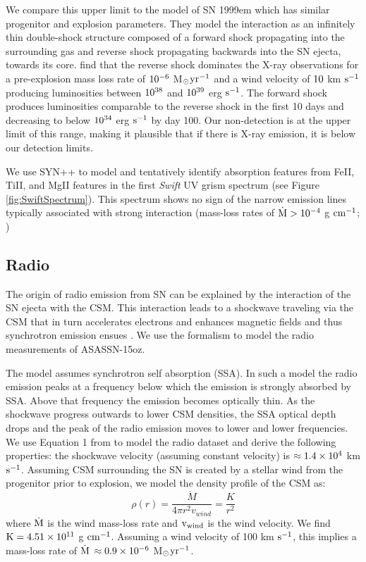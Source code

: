 \documentclass[a4paper,fleqn,usenatbib]{mnras}
\newcommand{\msunperiod}{M$\rm{_{\odot}}$}
\begin{document}
We compare this upper limit to the model of SN 1999em \citep{2007chugai} which has similar progenitor and explosion parameters. 
They model the interaction as an infinitely thin double-shock structure \citep{1982chevalier, 1985nadyozhin} composed of a forward shock propagating into the surrounding gas and reverse shock propagating backwards into the SN ejecta, towards its core. 
\citet{2007chugai} find that the reverse shock dominates the X-ray observations for a pre-explosion mass loss rate of $\rm{10^{-6}}$ \msunperiod $\rm{yr^{-1}}$ and a wind velocity of $\rm{10}$ km $\rm{s^{-1}}$ producing luminosities between $\rm{10^{38}}$ and $\rm{10^{39}}$ erg $\rm{s^{-1}}$. 
The forward shock produces luminosities comparable to the reverse shock in the first 10 days and decreasing to below $\rm{10^{34}}$ erg $\rm{s^{-1}}$ by day 100.  
Our non-detection is at the upper limit of this range, making it plausible that if there is X-ray emission, it is below our detection limits.

We use SYN++ to model and tentatively identify absorption features from FeII, TiII, and MgII features in the first {\it Swift} UV grism spectrum (see Figure \ref{fig:SwiftSpectrum}). 
This spectrum shows no sign of the narrow emission lines typically associated with strong interaction (mass-loss rates of $\rm{\dot{M}>10^{-4}}$ g $\rm{cm^{-1}}$; \citealt{2012kiewe})
\subsection{Radio}
The origin of radio emission from SN can be explained by the interaction of the SN ejecta with the CSM. 
This interaction leads to a shockwave traveling via the CSM that in turn accelerates electrons and enhances magnetic fields and thus synchrotron emission ensues \citep{1982chevalier,1998chevalier, 2002weiler, 2006chevalier}. 
We use the \citet{1998chevalier} formalism to model the radio measurements of ASASSN-15oz. 

The \citet{1998chevalier} model assumes synchrotron self absorption (SSA). 
In such a model the radio emission peaks at a frequency below which the emission is strongly absorbed by SSA. 
Above that frequency the emission becomes optically thin. 
As the shockwave progress outwards to lower CSM densities, the SSA optical depth drops and the peak of the radio emission moves to lower and lower frequencies. 
We use Equation 1 from \citet{1998chevalier} to model the radio dataset and derive the following properties: the shockwave velocity (assuming constant velocity) is $\rm{\approx 1.4\times10^{4}}$ km $\rm{s^{-1}}$. 
Assuming CSM surrounding the SN is created by a stellar wind from the progenitor prior to explosion, we model the density profile of the CSM as:
\begin{equation} \label{eqn:density}
\rho(r) = \frac{\dot{M}}{4\pi r^{2}v_{wind}} = \frac{K}{r^{2}}
\end{equation}
where $\rm{\dot{M}}$ is the wind mass-loss rate and $\rm{v_{wind}}$ is the wind velocity.
We find $\rm{K = 4.51\times 10^{11}}$ g $\rm{cm^{-1}}$.
Assuming a wind velocity of 100 km $\rm{s^{-1}}$, this implies a mass-loss rate of $\rm{\dot{M}}$ $\rm{\approx 0.9\times 10^{-6}}$ \msunperiod $\rm{yr^{-1}}$.
\end{document}
